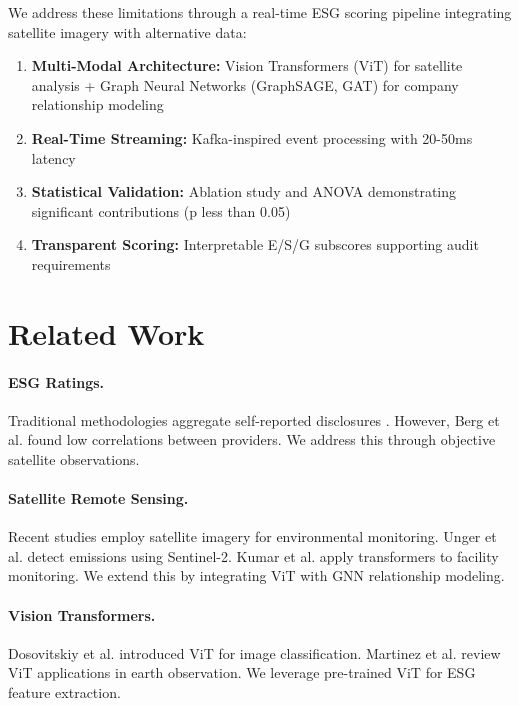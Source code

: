 \documentclass[10pt,twocolumn]{article}
\begin{document}
We address these limitations through a real-time ESG scoring pipeline integrating satellite imagery with alternative data:

\begin{enumerate}
\item \textbf{Multi-Modal Architecture:} Vision Transformers (ViT) for satellite analysis + Graph Neural Networks (GraphSAGE, GAT) for company relationship modeling
\item \textbf{Real-Time Streaming:} Kafka-inspired event processing with 20-50ms latency
\item \textbf{Statistical Validation:} Ablation study and ANOVA demonstrating significant contributions (p less than 0.05)
\item \textbf{Transparent Scoring:} Interpretable E/S/G subscores supporting audit requirements
\end{enumerate}

\section{Related Work}

\paragraph{ESG Ratings.} Traditional methodologies aggregate self-reported disclosures \cite{friede2015esg}. However, Berg et al. \cite{berg2019aggregate} found low correlations between providers. We address this through objective satellite observations.

\paragraph{Satellite Remote Sensing.} Recent studies employ satellite imagery for environmental monitoring. Unger et al. \cite{unger2020satellite} detect emissions using Sentinel-2. Kumar et al. \cite{kumar2024satellite} apply transformers to facility monitoring. We extend this by integrating ViT with GNN relationship modeling.

\paragraph{Vision Transformers.} Dosovitskiy et al. \cite{dosovitskiy2020image} introduced ViT for image classification. Martinez et al. \cite{martinez2024vit} review ViT applications in earth observation. We leverage pre-trained ViT for ESG feature extraction.
\end{document}
